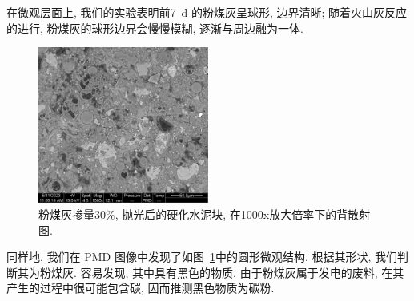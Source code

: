 在微观层面上, 我们的实验表明前\SI{7}{\day} 的粉煤灰呈球形, 边界清晰; 随着火山灰反应的进行, 粉煤灰的球形边界会慢慢模糊, 逐渐与周边融为一体.

\begin{figure}[!t]
  \centering
  \includegraphics[width = 0.5\textwidth]{assets/30-polished-01000x-PMD.png}
  \caption{粉煤灰掺量30\%, 抛光后的硬化水泥块, 在1000x放大倍率下的背散射图. }
  \label{fig:BSE-FA}
\end{figure}

同样地, 我们在 PMD 图像中发现了如图~\ref{fig:BSE-FA}中的圆形微观结构, 根据其形状, 我们判断其为粉煤灰. 容易发现, 其中具有黑色的物质. 由于粉煤灰属于发电的废料, 在其产生的过程中很可能包含碳, 因而推测黑色物质为碳粉.
